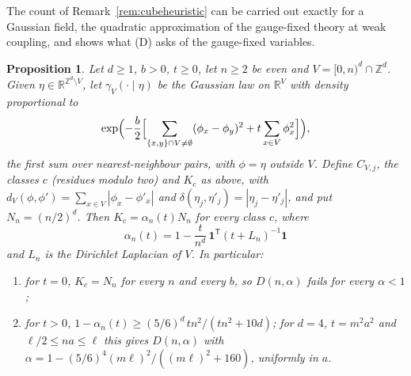 \documentclass[aps,prd,twocolumn,superscriptaddress,nofootinbib,longbibliography,floatfix,amsmath,amssymb,10pt]{revtex4-2}
\newtheorem{proposition}[theorem]{Proposition}
\theoremstyle{definition}
\theoremstyle{remark}
\newcommand{\R}{\mathbb{R}}
\newcommand{\Z}{\mathbb{Z}}
\begin{document}
The count of Remark~\ref{rem:cubeheuristic} can be carried out exactly for a
Gaussian field, the quadratic approximation of the gauge-fixed theory at weak
coupling, and shows what (D) asks of the gauge-fixed variables.

\begin{proposition}\label{prop:gauss}
Let $d\ge1$, $b>0$, $t\ge0$, let $n\ge2$ be even and $V=[0,n)^d\cap\Z^d$.
Given $\eta\in\R^{\Z^d\setminus V}$, let $\gamma_V(\cdot\mid\eta)$ be the
Gaussian law on $\R^V$ with density proportional to
\[
\exp\Bigl(-\frac b2\Bigl[\sum_{\{x,y\}\cap V\ne\emptyset}(\phi_x-\phi_y)^2
+t\sum_{x\in V}\phi_x^2\Bigr]\Bigr),
\]
the first sum over nearest-neighbour pairs, with $\phi=\eta$ outside $V$.
Define $C_{V,j}$, the classes $c$ (residues modulo two) and $K_c$ as above,
with $d_V(\phi,\phi')=\sum_{x\in V}|\phi_x-\phi'_x|$ and $\delta(\eta_j,\eta'_j)
=|\eta_j-\eta'_j|$, and put $N_n=(n/2)^d$. Then $K_c=\alpha_n(t)N_n$ for every
class $c$, where
\[
\alpha_n(t)=1-\frac t{n^d}\,\mathbf 1^{\mathsf T}(t+L_n)^{-1}\mathbf 1
\]
and $L_n$ is the Dirichlet Laplacian of $V$. In particular:
\begin{enumerate}[label=\textup{(\roman*)},leftmargin=*]
\item for $t=0$, $K_c=N_n$ for every $n$ and every $b$, so $D(n,\alpha)$
fails for every $\alpha<1$;
\item for $t>0$, $1-\alpha_n(t)\ge(5/6)^d\,tn^2/(tn^2+10d)$; for $d=4$,
$t=m^2a^2$ and $\ell/2\le na\le\ell$ this gives $D(n,\alpha)$ with
$\alpha=1-(5/6)^4(m\ell)^2/((m\ell)^2+160)$, uniformly in $a$.
\end{enumerate}
\end{proposition}
\end{document}
